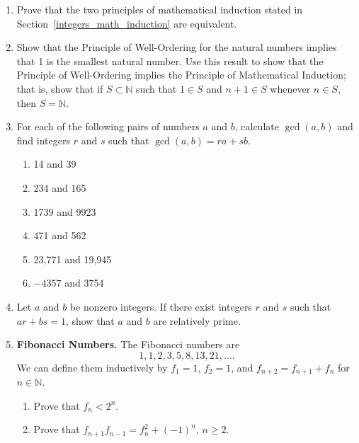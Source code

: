 {\begin{enumerate}
\item
Prove that the two principles of mathematical induction stated in Section~\ref{integers_math_induction} are equivalent. 

\item
Show that the Principle of Well-Ordering for the natural numbers implies that 1 is the smallest natural number.  Use this result to show that the Principle of Well-Ordering implies the Principle of Mathematical Induction; that is, show that if $S \subset {\mathbb N}$ such that $1 \in S$ and $n + 1 \in S$ whenever $n \in S$, then $S = {\mathbb N}$.  

\item
For each of the following pairs of numbers $a$ and $b$, calculate $\gcd(a,b)$ and find integers $r$ and $s$ such that  $\gcd(a,b) = ra + sb$. 
\begin{multicols}{2}
\begin{enumerate}

\item 
14 and 39

\item
234 and 165

\item
1739 and 9923

\item
471 and 562

\item
23,771 and 19,945

\item
$-4357$ and 3754

\end{enumerate}
\end{multicols}
 
\item
Let $a$ and $b$ be nonzero integers. If there exist integers $r$ and $s$ such that $ar +bs =1$, show that $a$ and $b$ are relatively prime.
 
 
\item
{\bf Fibonacci Numbers.}
The Fibonacci numbers are
\[
1, 1, 2, 3, 5, 8, 13, 21, \ldots.
\]
We can define them inductively by $f_1 = 1$, $f_2 = 1$, and $f_{n + 2} = f_{n + 1} + f_n$ for $n \in {\mathbb N}$. 
\begin{enumerate}
 
 \item
Prove that $f_n < 2^n$.
 
 \item
Prove that $f_{n + 1} f_{n - 1} = f^2_n + (-1)^n$, $n \geq 2$.
 

\end{enumerate}
\end{enumerate}}
